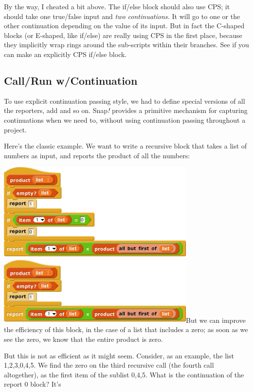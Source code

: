 By the way, I cheated a bit above. The if/else block should also use
CPS; it should take one true/false input and \emph{two continuations.}
It will go to one or the other continuation depending on the value of
its input. But in fact the C-shaped blocks (or E-shaped, like if/else)
are really using CPS in the first place, because they implicitly wrap
rings around the sub-scripts within their branches. See if you can make
an explicitly CPS if/else block.

\subsection{Call/Run w/Continuation}\label{callrun-wcontinuation}

To use explicit continuation passing style, we had to define special
versions of all the reporters, add and so on. Snap\emph{!} provides a
primitive mechanism for capturing continuations when we need to, without
using continuation passing throughout a project.

Here's the classic example. We want to write a recursive block that
takes a list of numbers as input, and reports the product of all the
numbers:

\includegraphics[width=3.89583in,height=1.9375in]{media/image910.png}\includegraphics[width=3.89583in,height=1.34167in]{media/image911.png}But
we can improve the efficiency of this block, in the case of a list that
includes a zero; as soon as we see the zero, we know that the entire
product is zero.

But this is not as efficient as it might seem. Consider, as an example,
the list 1,2,3,0,4,5. We find the zero on the third recursive call (the
fourth call altogether), as the first item of the sublist 0,4,5. What is
the continuation of the report 0 block? It's

